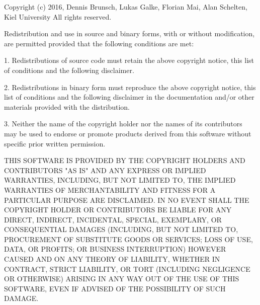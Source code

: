 \documentclass{article}
\begin{document}
Copyright (c) 2016, Dennis Brunsch, Lukas Galke, Florian Mai, Alan Schelten, Kiel University
All rights reserved.

Redistribution and use in source and binary forms, with or without modification, are permitted provided that the following conditions are met:

1. Redistributions of source code must retain the above copyright notice, this list of conditions and the following disclaimer.

2. Redistributions in binary form must reproduce the above copyright notice, this list of conditions and the following disclaimer in the documentation and/or other materials provided with the distribution.

3. Neither the name of the copyright holder nor the names of its contributors may be used to endorse or promote products derived from this software without specific prior written permission.

THIS SOFTWARE IS PROVIDED BY THE COPYRIGHT HOLDERS AND CONTRIBUTORS "AS IS" AND ANY EXPRESS OR IMPLIED WARRANTIES, INCLUDING, BUT NOT LIMITED TO, THE IMPLIED WARRANTIES OF MERCHANTABILITY AND FITNESS FOR A PARTICULAR PURPOSE ARE DISCLAIMED. IN NO EVENT SHALL THE COPYRIGHT HOLDER OR CONTRIBUTORS BE LIABLE FOR ANY DIRECT, INDIRECT, INCIDENTAL, SPECIAL, EXEMPLARY, OR CONSEQUENTIAL DAMAGES (INCLUDING, BUT NOT LIMITED TO, PROCUREMENT OF SUBSTITUTE GOODS OR SERVICES; LOSS OF USE, DATA, OR PROFITS; OR BUSINESS INTERRUPTION) HOWEVER CAUSED AND ON ANY THEORY OF LIABILITY, WHETHER IN CONTRACT, STRICT LIABILITY, OR TORT (INCLUDING NEGLIGENCE OR OTHERWISE) ARISING IN ANY WAY OUT OF THE USE OF THIS SOFTWARE, EVEN IF ADVISED OF THE POSSIBILITY OF SUCH DAMAGE.
\end{document}
